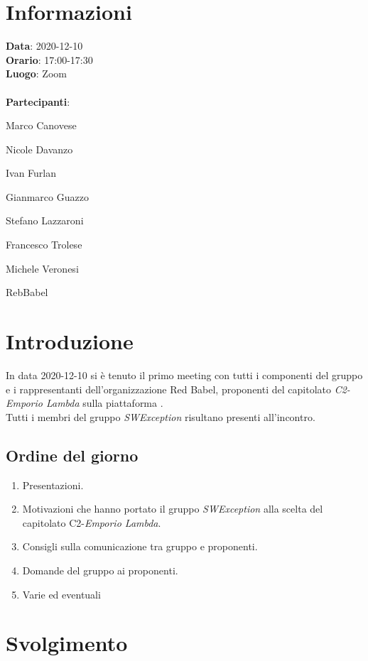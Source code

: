 \section{Informazioni}
\textbf{Data}: 2020-12-10\\
\textbf{Orario}: 17:00-17:30\\
\textbf{Luogo}: Zoom\\\\
\textbf{Partecipanti}:\begin{list}{*}{\setlength{\itemsep}{0cm}}
	\item Marco Canovese
	\item Nicole Davanzo
	\item Ivan Furlan
	\item Gianmarco Guazzo
	\item Stefano Lazzaroni
	\item Francesco Trolese
	\item Michele Veronesi
	\item RebBabel
\end{list}

\section{Introduzione}
In data 2020-12-10 si è tenuto il primo meeting con tutti i componenti del gruppo e i rappresentanti dell'organizzazione Red Babel, proponenti del capitolato \textit{C2-Emporio Lambda} sulla piattaforma . \\
Tutti i membri del gruppo \textit{SWException} risultano presenti all'incontro.

\subsection{Ordine del giorno}
\begin{enumerate}
    \item Presentazioni.
    \item Motivazioni che hanno portato il gruppo \textit{SWException} alla scelta del capitolato C2-\textit{Emporio Lambda}.
    \item Consigli sulla comunicazione tra gruppo e proponenti.
    \item Domande del gruppo ai proponenti.
    \item Varie ed eventuali
\end{enumerate}

\section{Svolgimento}


